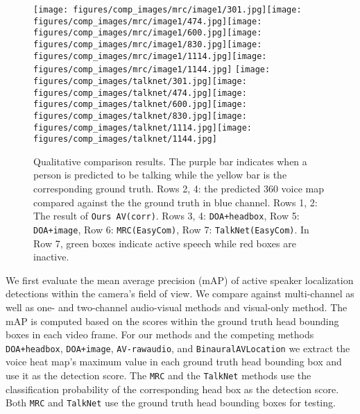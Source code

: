 \documentclass[10pt,twocolumn,letterpaper]{article}
\begin{document}
\begin{figure*}[tb]
\texttt{[image: figures/comp\_images/mrc/image1/301.jpg]}\texttt{[image: figures/comp\_images/mrc/image1/474.jpg]}\texttt{[image: figures/comp\_images/mrc/image1/600.jpg]}\texttt{[image: figures/comp\_images/mrc/image1/830.jpg]}\texttt{[image: figures/comp\_images/mrc/image1/1114.jpg]}\texttt{[image: figures/comp\_images/mrc/image1/1144.jpg]}\linebreak
\texttt{[image: figures/comp\_images/talknet/301.jpg]}\texttt{[image: figures/comp\_images/talknet/474.jpg]}\texttt{[image: figures/comp\_images/talknet/600.jpg]}\texttt{[image: figures/comp\_images/talknet/830.jpg]}\texttt{[image: figures/comp\_images/talknet/1114.jpg]}\texttt{[image: figures/comp\_images/talknet/1144.jpg]}\vspace{-5pt}
	\caption{ Qualitative comparison results. The purple bar indicates when a person is predicted
	to be talking while the yellow bar is the corresponding ground truth.
	Rows 2, 4: the predicted 360 voice map compared against the the ground truth in blue channel. 
	Rows 1, 2: The result of \texttt{Ours AV(corr)}. Rows 3, 4: \texttt{DOA+headbox}, Row 5: \texttt{DOA+image},   
	Row 6: \texttt{MRC(EasyCom)}, Row 7: \texttt{TalkNet(EasyCom)}. In Row 7, green boxes indicate active speech
	while red boxes are inactive.
	}
\vspace{-10pt}	
\label{fig:comparison}	
\end{figure*}


We first evaluate the mean average precision (mAP)
of active speaker localization detections
within the camera's field of view. We compare against multi-channel as well as one- and two-channel 
audio-visual methods and visual-only method.
The mAP is computed based on the scores
within the 
ground truth head bounding boxes in each video frame.
For our methods and the competing methods \texttt{DOA+headbox}, \texttt{DOA+image}, \texttt{AV-rawaudio}, and \texttt{BinauralAVLocation} 
we extract the voice heat map's maximum value in each ground truth head bounding box and use it 
as the detection score. The \texttt{MRC} and 
the \texttt{TalkNet} methods use the classification probability of the corresponding head box as the detection score. 
Both \texttt{MRC} and \texttt{TalkNet} use the ground truth head bounding boxes for testing. 
\end{document}
